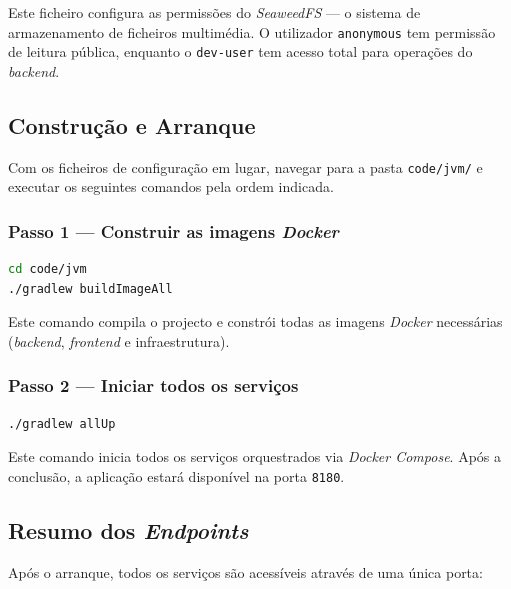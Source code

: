\documentclass[12pt,a4paper]{article}
\begin{document}
Este ficheiro configura as permissões do \textit{SeaweedFS} — o sistema de armazenamento de ficheiros multimédia. O utilizador \texttt{anonymous} tem permissão de leitura pública, enquanto o \texttt{dev-user} tem acesso total para operações do \textit{backend}.

\subsection{Construção e Arranque}

Com os ficheiros de configuração em lugar, navegar para a pasta \texttt{code/jvm/} e executar os seguintes comandos pela ordem indicada.

\subsubsection{Passo 1 — Construir as imagens \textit{Docker}}

\begin{lstlisting}[language=bash]
cd code/jvm
./gradlew buildImageAll
\end{lstlisting}

Este comando compila o projecto e constrói todas as imagens \textit{Docker} necessárias (\textit{backend}, \textit{frontend} e infraestrutura).

\subsubsection{Passo 2 — Iniciar todos os serviços}

\begin{lstlisting}[language=bash]
./gradlew allUp
\end{lstlisting}

Este comando inicia todos os serviços orquestrados via \textit{Docker Compose}. Após a conclusão, a aplicação estará disponível na porta \texttt{8180}.

\subsection{Resumo dos \textit{Endpoints}}

Após o arranque, todos os serviços são acessíveis através de uma única porta:
\end{document}
